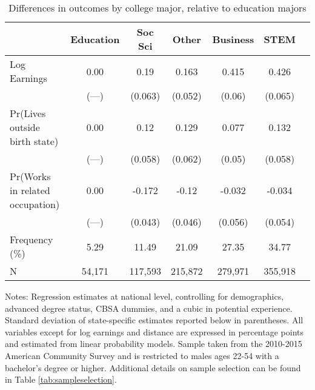 \begin{table}[ht]
\caption{Differences in outcomes by college major, relative to education majors}
\label{tab:samplemeans}
\centering
\begin{threeparttable}
\begin{tabular}{lcccccc}
\toprule
                                & Education & Soc Sci & Other   & Business & STEM     \\
\midrule
Log Earnings                    & 0.00      & 0.19   & 0.163   & 0.415   & 0.426    \\
                                & (---)      & (0.063)   & (0.052)   & (0.06)   & (0.065)    \\
Pr(Lives outside birth state)   & 0.00      & 0.12   & 0.129   & 0.077   & 0.132    \\
                                & (---)      & (0.058)   & (0.062)   & (0.05)   & (0.058)    \\
Pr(Works in related occupation) & 0.00      & -0.172   & -0.12   & -0.032   & -0.034    \\
                                & (---)      & (0.043)   & (0.046)   & (0.056)   & (0.054)    \\
\midrule
Frequency (\%)                  & 5.29   & 11.49   & 21.09   & 27.35   & 34.77 \\ 
N                               & 54,171 & 117,593 & 215,872 & 279,971 & 355,918 \\ 
\bottomrule
\end{tabular}
{\footnotesize {\raggedright Notes: Regression estimates at national level, controlling for demographics, advanced degree status, CBSA dummies, and a cubic in potential experience. Standard deviation of state-specific estimates reported below in parentheses. All variables except for log earnings and distance are expressed in percentage points and estimated from linear probability models. Sample taken from the 2010-2015 American Community Survey and is restricted to males ages 22-54 with a bachelor's degree or higher. Additional details on sample selection can be found in Table \ref{tab:sampleselection}.}}
\end{threeparttable}
\end{table}
